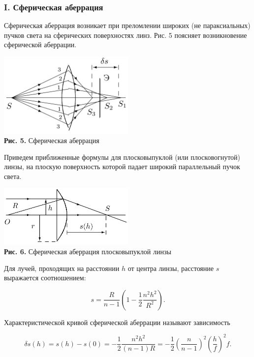 \documentclass[a4paper,12pt]{article} %
\begin{document}
\subsubsection*{I. Сферическая аберрация}
\hfill \break Сферическая аберрация возникает при преломлении широких (не параксиальных) пучков света на сферических поверхностях линз. Рис. 5 поясняет возникновение сферической аберрации.

\begin{center}
\includegraphics[width=0.5\textwidth]{4.1.1_5.png}\\
\textbf{Рис. 5.} Сферическая аберрация \\
\end{center}

\hfill \break Приведем приближенные формулы для плосковыпуклой (или плосковогнутой) линзы, на плоскую поверхность которой падает широкий параллельный пучок света.

\begin{center}
\includegraphics[width=0.5\textwidth]{4.1.1_7.png}\\
\textbf{Рис. 6.} Сферическая аберрация плосковыпуклой линзы \\
\end{center}

\hfill \break Для лучей, проходящих на расстоянии $h$ от центра линзы, расстояние $s$ выражается соотношением:
	
 \begin{equation}
s = \frac{R}{n - 1}\left(1 - \frac{1}{2} \frac{n^2 h^2}{R^2}\right).
\end{equation}

\hfill \break Характеристической кривой сферической аберрации называют зависимость 

\begin{equation}
\delta s(h) = s(h) - s(0) = -\frac{1}{2}\frac{n^2 h^2}{(n - 1)R} = -\frac{1}{2}\left(\frac{n}{n - 1}\right)^2 \left(\frac{h}{f}\right)^2 f.
\label{eq:8}
\end{equation}
\end{document}
